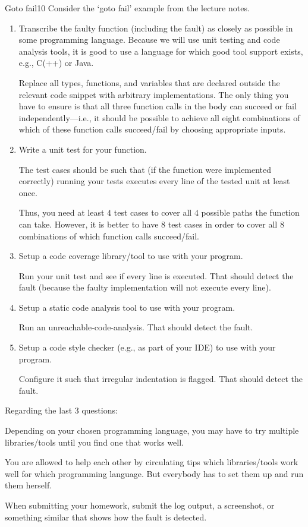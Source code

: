 \documentclass[a4paper]{article}
\begin{document}
\header

\begin{problem}{Goto fail}{10}
Consider the `goto fail' example from the lecture notes.

\begin{enumerate}
\item Transcribe the faulty function (including the fault) as closely as possible in some programming language.
Because we will use unit testing and code analysis tools, it is good to use a language for which good tool support exists, e.g., C(++) or Java.

Replace all types, functions, and variables that are declared outside the relevant code snippet with arbitrary implementations.
The only thing you have to ensure is that all three function calls in the body can succeed or fail independently---i.e., it should be possible to achieve all eight combinations of which of these function calls succeed/fail by choosing appropriate inputs.

\item Write a unit test for your function.

The test cases should be such that (if the function were implemented correctly) running your tests executes every line of the tested unit at least once.

Thus, you need at least $4$ test cases to cover all $4$ possible paths the function can take.
However, it is better to have $8$ test cases in order to cover all $8$ combinations of which function calls succeed/fail.

\item Setup a code coverage library/tool to use with your program.

Run your unit test and see if every line is executed.
That should detect the fault (because the faulty implementation will not execute every line).

\item Setup a static code analysis tool to use with your program.

Run an unreachable-code-analysis.
That should detect the fault.

\item Setup a code style checker (e.g., as part of your IDE) to use with your program.

Configure it such that irregular indentation is flagged.
That should detect the fault.
\end{enumerate}

Regarding the last 3 questions:
\begin{compactitem}
 \item Depending on your chosen programming language, you may have to try multiple libraries/tools until you find one that works well.
 \item You are allowed to help each other by circulating tips which libraries/tools work well for which programming language.
 But everybody has to set them up and run them herself.
 \item When submitting your homework, submit the log output, a screenshot, or something similar that shows how the fault is detected.
\end{compactitem}
\end{problem}
\end{document}
